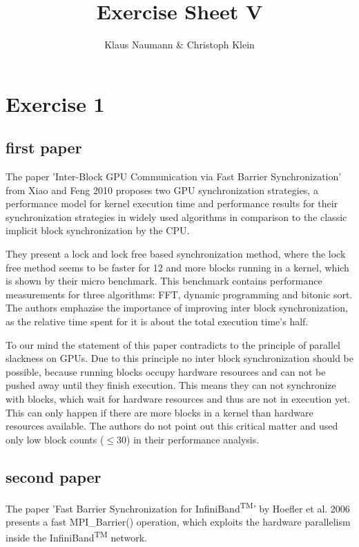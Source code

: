 \documentclass[oneside,a4paper]{scrartcl}
\begin{document}

\title{Exercise Sheet V}
\subject{Advanced Parallel Computing}
\author{Klaus Naumann \& Christoph Klein}
\maketitle
\section*{Exercise 1}
\subsection*{first paper}
The paper 'Inter-Block GPU Communication via Fast Barrier Synchronization' from
Xiao and Feng 2010 proposes two GPU synchronization strategies, a performance
model for kernel execution time and performance results for their synchronization
strategies in widely used algorithms in comparison to the classic implicit block
synchronization by the CPU.

They present a lock and lock free based synchronization method, where the lock
free method seems to be faster for 12 and more blocks running in a kernel, which
is shown by their micro benchmark. This benchmark contains performance measurements
for three algorithms: FFT, dynamic programming and bitonic sort.
The authors emphazise the importance of improving inter block synchronization,
as the relative time spent for it is about the total execution time's half.

To our mind the statement of this paper contradicts to the principle of
parallel slackness on GPUs. Due to this principle no inter block synchronization
should be possible, because running blocks occupy hardware resources and can not be
pushed away until they finish execution. This means they can not synchronize with blocks,
which wait for hardware resources and thus are not in execution yet.
This can only happen if there are more blocks in a kernel than hardware resources
available. The authors do not point out this critical matter and used only low
block counts ($\le 30$) in their performance analysis.

\subsection*{second paper}
The paper 'Fast Barrier Synchronization for InfiniBand\textsuperscript{TM}'
by Hoefler et al. 2006 presents a fast MPI\_Barrier() operation, which exploits
the hardware parallelism inside the InfiniBand\textsuperscript{TM} network.
\end{document}
